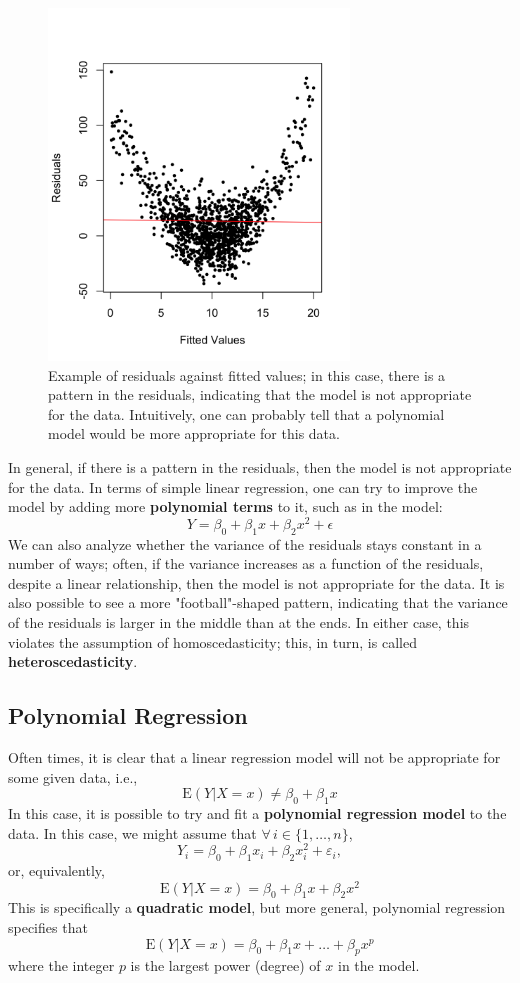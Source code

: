 \documentclass[12pt]{article}
\begin{document}
\begin{figure}[!ht]
    \centering
    \includegraphics*[width=8cm]{img/residualspolynomial.png}
    \caption{Example of residuals against fitted values; in this case, there is a pattern in the residuals, indicating that the model is not appropriate for the data. Intuitively, one can probably tell that a polynomial model would be more appropriate for this data.}
\end{figure}

In general, if there is a pattern in the residuals, then the model is not appropriate for the data. In terms of simple linear regression, one can try to improve the model by adding more \textbf{polynomial terms} to it, such as in the model:\[Y = \beta_0 + \beta_1 x + \beta_2 x^2 + \epsilon\] We can also analyze whether the variance of the residuals stays constant in a number of ways; often, if the variance increases as a function of the residuals, despite a linear relationship, then the model is not appropriate for the data. It is also possible to see a more "football"-shaped pattern, indicating that the variance of the residuals is larger in the middle than at the ends. In either case, this violates the assumption of homoscedasticity; this, in turn, is called \textbf{heteroscedasticity}.

\subsection{Polynomial Regression}

Often times, it is clear that a linear regression model will not be appropriate for some given data, i.e., \[\text{E}(Y | X = x) \neq \beta_0 + \beta_1 x\] In this case, it is possible to try and fit a \textbf{polynomial regression model} to the data. In this case, we might assume that $\forall \, i \in \{1,\dots, n\}$,\[Y_i = \beta_0 + \beta_1 x_i + \beta_2 x_i^2 + \varepsilon_i,\] or, equivalently, \[\text{E}(Y | X = x) = \beta_0 + \beta_1 x + \beta_2 x^2\] This is specifically a \textbf{quadratic model}, but more general, polynomial regression specifies that \[\text{E}(Y | X = x) = \beta_0 + \beta_1 x + \dots + \beta_p x^p\] where the integer $p$ is the largest power (degree) of $x$ in the model.
\end{document}
